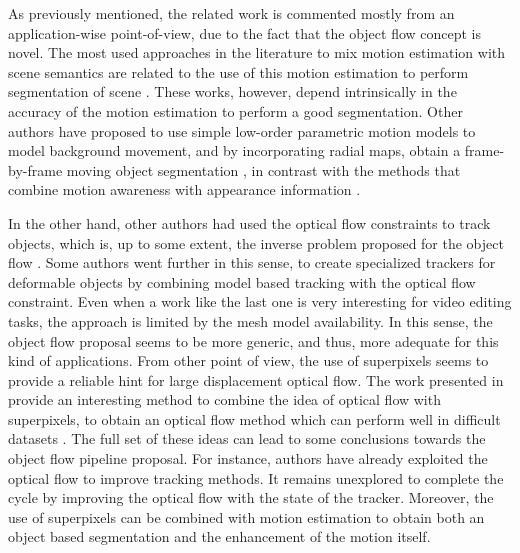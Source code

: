 As previously mentioned, the related work is commented mostly from an application-wise point-of-view, due to the fact that 
the object flow concept is novel. The most used approaches in the literature to mix motion estimation with scene semantics 
are related to the use of this motion estimation to perform segmentation of scene \cite{c33}\cite{c34}. These works, however, depend 
intrinsically in the accuracy of the motion estimation to perform a good segmentation. Other authors have proposed to use simple 
low-order parametric motion models to model background movement, and by incorporating radial maps, obtain a frame-by-frame 
moving object segmentation \cite{c36}, in contrast with the methods that combine motion awareness with appearance information \cite{c35}. 

In the other hand, other authors had used the optical flow constraints to track objects, 
which is, up to some extent, the inverse problem proposed for the object flow \cite{c37}. Some authors went further in this sense, to create specialized trackers 
for deformable objects by combining model based tracking with the optical flow constraint. Even when a work like the last one is very interesting for video editing 
tasks, the approach is limited by the mesh model availability. In this sense, the object flow proposal seems to be more generic, and thus, more adequate for this kind 
of applications.
From other point of view, the use of superpixels seems to provide a reliable hint for large displacement optical flow. The work presented in \cite{c39} 
provide an interesting method to combine the idea of optical flow with superpixels, to obtain an optical flow method which can perform well in difficult datasets \cite{c27}. 
The full set of these ideas can lead to some conclusions towards the object flow pipeline proposal. For instance, authors have already exploited the optical flow 
to improve tracking methods. It remains unexplored to complete the cycle by improving the optical flow with the state of the tracker. Moreover, the use of superpixels 
can be combined with motion estimation to obtain both an object based segmentation and the enhancement of the motion itself.




